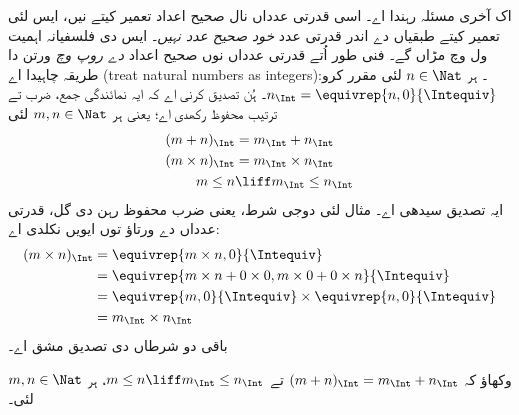 \documentclass[../../../include/open-logic-section]{subfiles}
\begin{document}
اک آخری مسئلہ رہندا اے۔ اسی قدرتی عدداں نال صحیح اعداد تعمیر کیتے نیں،
ایس لئی تعمیر کیتے طبقیاں دے اندر قدرتی عدد \emph{خود صحیح عدد نہیں}۔
ایس دی فلسفیانہ اہمیت ول  وچ مڑاں گے۔ فنی طور اُتے
قدرتی عدداں نوں صحیح اعداد \emph{دے روپ وچ} ورتن دا طریقہ چاہیدا اے
(treat natural numbers as integers)۔ ہر $n \in \Nat$ لئی مقرر کرو:
$n_\Int = \equivrep{n, 0}{\Intequiv}$۔ ہُن تصدیق کرنی اے کہ ایہ
نمائندگی جمع، ضرب تے ترتیب محفوظ رکھدی اے؛ یعنی ہر $m, n \in \Nat$ لئی
\begin{align*}
	(m + n)_\Int &= m_\Int + n_\Int\\
	(m \times n)_\Int &= m_\Int \times n_\Int\\
	m \leq n &\liff m_\Int \leq n_\Int
\end{align*}
ایہ تصدیق سیدھی اے۔ مثال لئی دوجی شرط، یعنی ضرب محفوظ رہن دی گل،
قدرتی عدداں دے ورتاؤ توں ایویں نکلدی اے:
	\begin{align*}
		(m \times n)_\Int  &= \equivrep{m \times n, 0}{\Intequiv} \\
		&= \equivrep{m \times n + 0 \times 0, m \times 0 + 0 \times n}{\Intequiv} \\
		&= \equivrep{m, 0}{\Intequiv} \times \equivrep{n, 0}{\Intequiv} \\
		&= m_\Int \times n_\Int
\end{align*}
باقی دو شرطاں دی تصدیق مشق اے۔
\begin{prob}
	وکھاؤ کہ $(m + n)_\Int = m_\Int + n_\Int$ تے
	$m \leq n \liff m_\Int \leq n_\Int$، ہر $m, n \in \Nat$ لئی۔
\end{prob}
\end{document}
